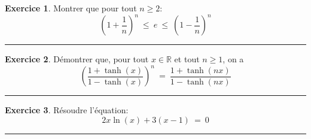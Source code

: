 \documentclass[10pt,a4paper]{article}
\newcommand{\R}{\mathbb{R}}
\theoremstyle{definition}
\theoremstyle{definition}
\newtheorem{exo}{Exercice}
\begin{document}
\begin{center}
\begin{minipage}[t]{0.47\linewidth}
\begin{exo}
Montrer que pour tout $n\geq 2$:
$$ \left(1+\dfrac{1}{n}\right)^n \ \leq \ e \ \leq \ \left(1-\dfrac{1}{n}\right)^n$$
\end{exo}

\begin{center}
\rule{1\linewidth}{0.6pt}
\end{center}

\begin{exo}
Démontrer que, pour tout $x\in\R$ et tout $n\geq 1$, on a
$$\left(\dfrac{1+ \tanh(x)}{1 - \tanh(x)}\right)^n \ = \ \dfrac{1+ \tanh(nx)}{1- \tanh(nx)}$$ 
\end{exo}

\begin{center}
\rule{1\linewidth}{0.6pt}
\end{center}

\begin{exo}
Résoudre l'équation: $$2x\ln(x) + 3(x-1) \ = \ 0 $$
\end{exo}
\begin{center}
\rule{1\linewidth}{0.6pt}
\end{center}


	\end{minipage}
\end{center}
\quad \\
\end{document}
